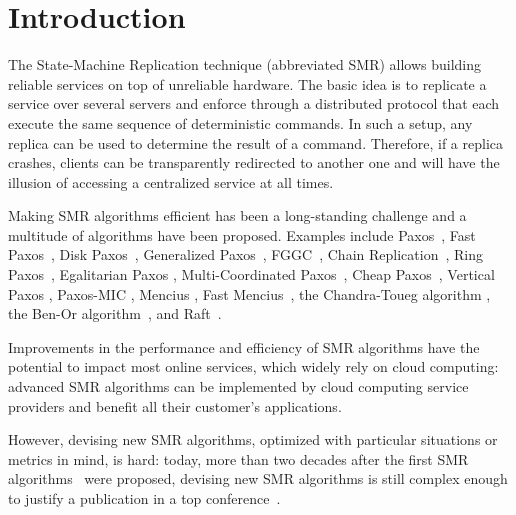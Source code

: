 \section{Introduction}

The State-Machine Replication technique (abbreviated SMR) allows building
reliable services on top of unreliable hardware. The basic idea is to
replicate a service over several servers and enforce through a distributed protocol that each execute the same sequence of
deterministic commands. In such a setup, any replica can be used to determine
the result of a command. Therefore, if a replica crashes, clients can be
transparently redirected to another one and will have the illusion of accessing
a centralized service at all times.

Making SMR algorithms efficient has been a long-standing challenge
and a multitude of algorithms have been proposed. Examples include
Paxos~\cite{lamport2001paxos}, Fast Paxos~\cite{Lamport06FastPaxos},
Disk Paxos~\cite{GafniLamport03DiskPaxos}, Generalized Paxos~\cite{Lamport05GeneralizeConsensus}, FGGC~\cite{SutraShapiro11FastGenuineGeneralizedConsensus}, Chain Replication~\cite{RenesseSchneider04ChainReplicationSupportingHighThroughputAvailability},
Ring Paxos~\cite{MarandiETAL10RingPaxosHighthroughputAtomicBroadcastProtocol},
Egalitarian Paxos
\cite{MoraruAndersenKaminsky13ThereIsMoreConsensusEgalitarianParliaments},
Multi-Coordinated Paxos~\cite{CamargosSchmidtPedone07MulticoordinatedPaxos},
Cheap Paxos~\cite{LamportMassa04CheapPaxos}, Vertical Paxos
\cite{LamportMalkhiZhou09VerticalPaxosPrimarybackupReplication}, Paxos-MIC
\cite{HurfinMoiseNarzul11AdaptiveFastPaxosMakingQuickEverlasting}, Mencius
\cite{MaoJunqueiraMarzullo08MenciusBuildingEfficientReplicatedStateMachine},
Fast Mencius~\cite{WeiETAL13FastMenciusMenciusLowCommitLatency},
the Chandra-Toueg algorithm
\cite{ChandraToueg96UnreliableFailureDetectorsReliableDistributedSystems}, the
Ben-Or algorithm~\cite{BenOr83AnotherAdvantageFreeChoiceCompletelyAsynchronous},
and Raft~\cite{OngaroOusterhout14SearchUnderstandableConsensusAlgorithm}.

Improvements in the performance and
efficiency of SMR algorithms have the potential to impact most online services, which widely rely on cloud computing:
advanced SMR algorithms can be implemented by cloud computing service providers
and benefit all their customer's applications.

However, devising new SMR algorithms, optimized with
particular situations or metrics in mind, is hard: today,
more than two decades after the first SMR algorithms~\cite{Lamport98ParttimeParliament,BirmanJoseph87ReliableCommunicationPresenceFailures,OkiLiskov88ViewstampedReplicationGeneralPrimaryCopy,DworkLynchStockmeyer84ConsensusPresencePartialSynchronyPreliminaryVersion} were proposed, devising new SMR algorithms is still complex enough to justify a publication in a top conference~\cite{MoraruAndersenKaminsky13ThereIsMoreConsensusEgalitarianParliaments,OngaroOusterhout14SearchUnderstandableConsensusAlgorithm}.

